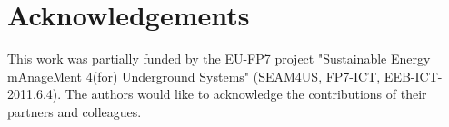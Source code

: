 \section*{Acknowledgements}
\label{sec:acknowledgements}

This work was partially funded by the EU-FP7 project "Sustainable Energy mAnageMent 4(for) Underground Systems" (SEAM4US, FP7-ICT, EEB-ICT-2011.6.4). The authors would like to acknowledge the contributions of their partners and colleagues.